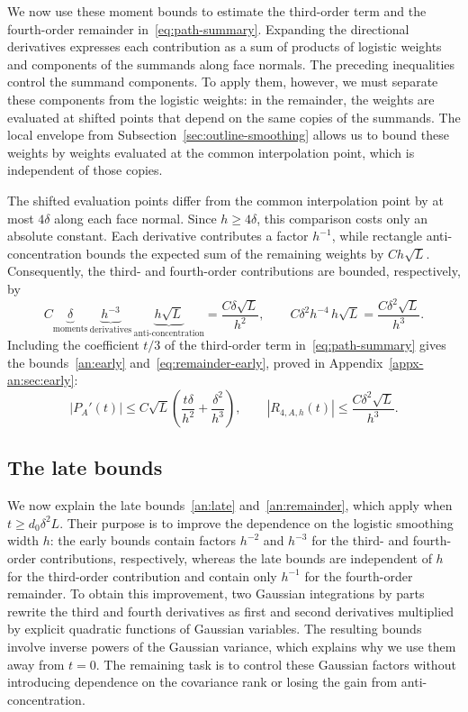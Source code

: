 \documentclass[11pt,letterpaper]{article}
\theoremstyle{remark}
\begin{document}
We now use these moment bounds to estimate the third-order term and
the fourth-order remainder in~\eqref{eq:path-summary}. Expanding the
directional derivatives expresses each contribution as a sum of
products of logistic weights and components of the summands along
face normals. The preceding inequalities control the summand
components. To apply them, however, we must separate these components
from the logistic weights: in the remainder, the weights are
evaluated at shifted points that depend on the same copies of the
summands. The local envelope from
Subsection~\ref{sec:outline-smoothing} allows us to bound these weights
by weights evaluated at the common interpolation point, which is
independent of those copies.

The shifted evaluation points differ from the common interpolation
point by at most \(4\delta\) along each face normal. Since
\(h\ge4\delta\), this comparison costs only an absolute constant.
Each derivative contributes a factor \(h^{-1}\), while rectangle
anti-concentration bounds the expected sum of the remaining weights
by \(Ch\sqrt L\).
Consequently, the third- and fourth-order contributions are bounded,
respectively, by
\[
 C\underbrace{\delta}_{\text{moments}}\,
  \underbrace{h^{-3}}_{\text{derivatives}}\,
  \underbrace{h\sqrt L}_{\text{anti-concentration}}
  =\frac{C\delta\sqrt L}{h^2},
 \qquad
 C\delta^2h^{-4}\,h\sqrt L=\frac{C\delta^2\sqrt L}{h^3}.
\]
Including the coefficient \(t/3\) of the third-order term
in~\eqref{eq:path-summary} gives the bounds~\eqref{an:early}
and~\eqref{eq:remainder-early}, proved in
Appendix~\ref{appx-an:sec:early}:
\[
 |P_A'(t)|\le C\sqrt L
   \left(\frac{t\delta}{h^2}+\frac{\delta^2}{h^3}\right),
 \qquad
 |R_{4,A,h}(t)|\le\frac{C\delta^2\sqrt L}{h^3}.
\]
\subsection{The late bounds}
\label{sec:outline-late}

We now explain the late bounds~\eqref{an:late} and~\eqref{an:remainder},
which apply when \(t\ge d_0\delta^2L\). Their purpose is to improve
the dependence on the logistic smoothing width \(h\): the early bounds
contain factors \(h^{-2}\) and \(h^{-3}\) for the third- and fourth-order
contributions, respectively, whereas the late bounds are independent
of \(h\) for the third-order contribution and contain only \(h^{-1}\)
for the fourth-order remainder. To obtain this improvement, two
Gaussian integrations by parts rewrite the third and fourth
derivatives as first and second derivatives multiplied by explicit
quadratic functions of Gaussian variables. The resulting bounds
involve inverse powers of the Gaussian variance, which explains why
we use them away from \(t=0\). The remaining task is to control these
Gaussian factors without introducing dependence on the covariance
rank or losing the gain from anti-concentration.
\end{document}
